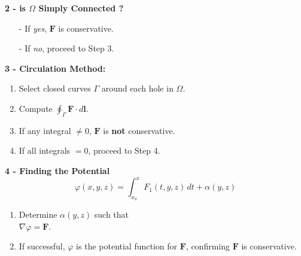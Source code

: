 \documentclass[8pt]{article}
\begin{document}
\hfill
\begin{minipage}[t]{0.25\textwidth}
    \noindent\textbf{2 - is $\Omega$ Simply Connected ?} \vspace{-8px}
    \begin{itemize}[leftmargin=*]
        \setlength\itemsep{-4px}
        \item[-] If \textit{yes}, $\mathbf{F}$ is conservative.
        \item[-] If \textit{no}, proceed to Step 3.
    \end{itemize}
    \vspace{-10px}
    \hspace{20px}

\end{minipage}
\hfill
\begin{minipage}[t]{0.23\textwidth}
    \noindent\textbf{3 - Circulation Method:} \vspace{-8px}
    \begin{enumerate}[leftmargin=*]
        \setlength\itemsep{-4px}
        \item Select closed curves $\Gamma$ around each hole in $\Omega$.
        \item Compute $\oint_{\Gamma} \mathbf{F} \cdot d\mathbf{l}$.
        \item If any integral $\neq 0$, $\mathbf{F}$ is \textbf{not} conservative.
        \item If all integrals $=0$, proceed to Step 4.
    \end{enumerate}
\end{minipage}
\hfill
\begin{minipage}[t]{0.29\textwidth}
    \noindent\textbf{4 - Finding the Potential} \vspace{-8px}
    \[
        \varphi(x,y,z) = \int_{x_0}^x F_1(t,y,z) \, dt + \alpha(y,z)
    \] \vspace{-25px}

    \begin{enumerate}[leftmargin=*]
        \setlength\itemsep{-4px} %
        \item Determine $\alpha(y,z)$ such that \\ $\nabla \varphi = \mathbf{F}$.
        \item If successful, $\varphi$ is the potential function for $\mathbf{F}$, confirming $\mathbf{F}$ is conservative.
    \end{enumerate}
\end{minipage}\\
\vspace*{-30px}
\end{document}
